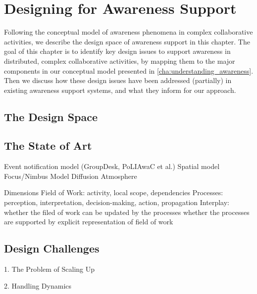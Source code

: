 \graphicspath{{Figures/}}

\chapter{Designing for Awareness Support} %
\label{cha:designing_for_awareness_support}
Following the conceptual model of awareness phenomena in complex collaborative activities, we describe the design space of awareness support in this chapter. The goal of this chapter is to identify key design issues to support awareness in distributed, complex collaborative activities, by mapping them to the major components in our conceptual model presented in \ref{cha:understanding_awareness}. Then we discuss how these design issues have been addressed (partially) in existing awareness support systems, and what they inform for our approach. 

\section{The Design Space} %
\label{sec:the_design_space}


\section{The State of Art} %
\label{sec:the_state_of_art}

Event notification model (GroupDesk, PoLIAwaC et al.)
Spatial model
Focus/Nimbus Model
Diffusion
Atmosphere

Dimensions
Field of Work: activity, local scope, dependencies
Processes: perception, interpretation, decision-making, action, propagation
Interplay: 
whether the filed of work can be updated by the processes
whether the processes are supported by explicit representation of field of work


\section{Design Challenges} %
\label{sec:design_challenges}
1. The Problem of Scaling Up

2. Handling Dynamics









 

